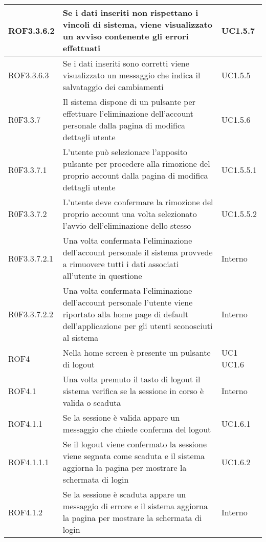 \begin{center}
\begin{longtable}{| p{2.5cm} | p{8cm} | p{2cm} |}
		\hline
		ROF3.3.6.2  &  Se i dati inseriti non rispettano i vincoli di sistema, viene visualizzato un avviso contenente gli errori effettuati  &  UC1.5.7 \\
		\hline
		ROF3.3.6.3  &  Se i dati inseriti sono corretti viene visualizzato un messaggio che indica il salvataggio dei cambiamenti  &  UC1.5.5 \\
		\hline
		R0F3.3.7  &  Il sistema dispone di un pulsante per effettuare l'eliminazione dell'account personale dalla pagina di modifica dettagli utente  &  UC1.5.6 \\
		\hline
		R0F3.3.7.1  &  L'utente può selezionare l'apposito pulsante per procedere alla rimozione del proprio account dalla pagina di modifica dettagli utente  &  UC1.5.5.1 \\
		\hline
		R0F3.3.7.2  &  L'utente deve confermare la rimozione del proprio account una volta selezionato l'avvio dell'eliminazione dello stesso  &  UC1.5.5.2 \\
		\hline
		R0F3.3.7.2.1  &  Una volta confermata l'eliminazione dell'account personale il sistema provvede a rimuovere tutti i dati associati all'utente in questione  &  Interno \\
		\hline
		R0F3.3.7.2.2  &  Una volta confermata l'eliminazione dell'account personale l'utente viene riportato alla home page di default dell'applicazione per gli utenti sconosciuti al sistema  &  Interno \\


		\hline
		ROF4  &  Nella home screen è presente un pulsante di logout  &  UC1 \newline UC1.6 \\
		\hline
		ROF4.1  &  Una volta premuto il tasto di logout il sistema verifica se la sessione in corso è valida o scaduta  &  Interno \\
		\hline
		ROF4.1.1  &  Se la sessione è valida appare un messaggio che chiede conferma del logout  &  UC1.6.1 \\
		\hline
		ROF4.1.1.1  &  Se il logout viene confermato la sessione viene segnata come scaduta e il sistema aggiorna la pagina per mostrare la schermata di login  &  UC1.6.2 \\
		\hline
		ROF4.1.2  &  Se la sessione è scaduta appare un messaggio di errore e il sistema aggiorna la pagina per mostrare la schermata di login  &  Interno \\



\end{longtable}
\end{center}
